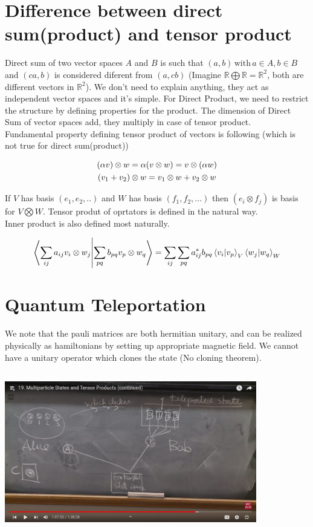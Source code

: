 \documentclass{report}
\begin{document}
\section{Difference between direct sum(product) and tensor product}

\noindent Direct sum of two vector spaces $A$ and $B$ is such that $(a,b)\, \textrm{with} \, a\in A, b\in B$ and $(ca, b)$ is considered diferent from $(a,cb)$ (Imagine $\mathbb{R}\bigoplus\mathbb{R} = \mathbb{R}^2$, both are different vectors in $\mathbb{R}^2$). We don't need to explain anything, they act as independent vector spaces and it's simple. For Direct Product, we need to restrict the structure by defining properties for the product. The dimension of Direct Sum of vector spaces add, they multiply in case of tensor product.\\

\noindent Fundamental property defining tensor product of vectors is following (which is not true for direct sum(product))

\begin{gather}
  (\alpha v) \otimes w = \alpha (v \otimes w) = v \otimes (\alpha w)\notag \\
  (v_1+v_2)\otimes w = v_1\otimes w + v_2\otimes w 
\end{gather}

\noindent If $V$ has basis $(e_1,e_2,..)$ and $W$ has basis $(f_1,f_2,...)$ then $(e_i\otimes f_j)$ is basis for $V\bigotimes W$. Tensor produt of oprtators is defined in the natural way. \\

\noindent Inner product is also defined most naturally.

$$\braket{\sum_{ij}a_{ij}v_i\otimes w_j}{\sum_{pq}b_{pq}v_p\otimes w_q} = \sum_{ij}\sum_{pq}a^{*}_{ij}b_{pq}\braket{v_i}{v_p}_V\braket{w_j}{w_q}_W$$

\section{Quantum Teleportation}

We note that the pauli matrices are both hermitian unitary, and can be realized physically as hamiltonians by setting up appropriate magnetic field. We cannot have a unitary operator which clones the state (No cloning theorem). 


\includegraphics[width=11cm, height=7cm]{./Images/Teleportation.png}\\
\end{document}
